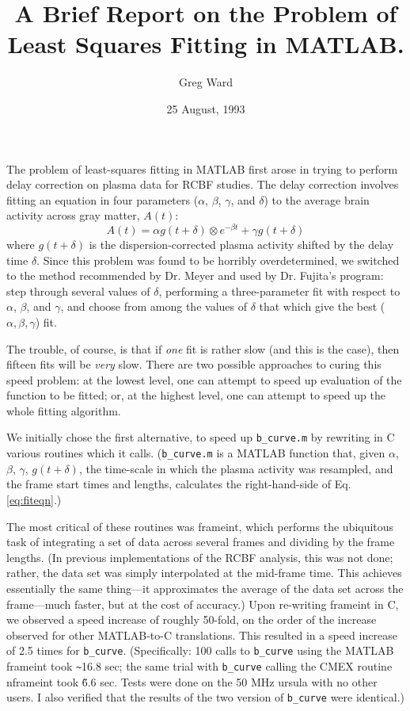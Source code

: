 
\title{A Brief Report on the Problem of Least Squares Fitting in MATLAB.}
\author{Greg Ward}
\date{25 August, 1993}



\maketitle

The problem of least-squares fitting in MATLAB first arose in trying
to perform delay correction on plasma data for RCBF studies.  The
delay correction involves fitting an equation in four parameters
($\alpha$, $\beta$, $\gamma$, and $\delta$) to the average brain
activity across gray matter, $A(t)$:
\begin{equation}
A(t) = \alpha g(t+\delta) \otimes e^{-\beta t} + \gamma g(t+\delta)
\label{eq:fiteqn}
\end{equation}
where $g(t+\delta)$ is the dispersion-corrected plasma activity
shifted by the delay time $\delta$.  Since this problem was found to
be horribly overdetermined, we switched to the method recommended by
Dr. Meyer and used by Dr. Fujita's program: step through several
values of $\delta$, performing a three-parameter fit with respect to
$\alpha$, $\beta$, and $\gamma$, and choose from among the values of
$\delta$ that which give the best ($\alpha, \beta, \gamma$) fit.

The trouble, of course, is that if {\em one} fit is rather slow (and
this is the case), then fifteen fits will be {\em very} slow.  There
are two possible approaches to curing this speed problem: at the
lowest level, one can attempt to speed up evaluation of the function
to be fitted; or, at the highest level, one can attempt to speed up
the whole fitting algorithm.

We initially chose the first alternative, to speed up \verb|b_curve.m|
by rewriting in C various routines which it calls.  (\verb|b_curve.m|
is a MATLAB function that, given $\alpha$, $\beta$, $\gamma$,
$g(t+\delta)$, the time-scale in which the plasma activity was
resampled, and the frame start times and lengths, calculates the
right-hand-side of Eq. \ref{eq:fiteqn}.)

The most critical of these routines was frameint, which performs the
ubiquitous task of integrating a set of data across several frames and
dividing by the frame lengths.  (In previous implementations of the
RCBF analysis, this was not done; rather, the data set was simply
interpolated at the mid-frame time.  This achieves essentially the
same thing---it approximates the average of the data set across the
frame---much faster, but at the cost of accuracy.)  Upon re-writing
frameint in C, we observed a speed increase of roughly 50-fold, on the
order of the increase observed for other MATLAB-to-C translations.
This resulted in a speed increase of 2.5 times for \verb|b_curve|.
(Specifically: 100 calls to \verb|b_curve| using the MATLAB frameint
took \verb|~|16.8 sec; the same trial with \verb|b_curve| calling the CMEX
routine nframeint took \~6.6 sec.  Tests were done on the 50 MHz ursula
with no other users.  I also verified that the results of the two
version of \verb|b_curve| were identical.)

